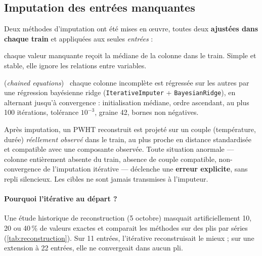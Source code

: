 \subsection{Imputation des entrées manquantes}
\label{subsec:imputation}

Deux méthodes d'imputation ont été mises en œuvre, toutes deux \textbf{ajustées
dans chaque train} et appliquées aux seules \emph{entrées} :
\begin{description}[leftmargin=1em,style=nextline]
  \item[Médiane] chaque valeur manquante reçoit la médiane de la colonne dans le
  train. Simple et stable, elle ignore les relations entre variables.
  \item[Itérative] (\emph{chained equations})~\cite{vanbuuren_2011} chaque
  colonne incomplète est régressée sur les autres par une régression bayésienne
  ridge (\texttt{IterativeImputer} + \texttt{BayesianRidge}), en alternant
  jusqu'à convergence : initialisation médiane, ordre ascendant, au plus 100
  itérations, tolérance $10^{-3}$, graine 42, bornes non négatives.
\end{description}
Après imputation, un PWHT reconstruit est projeté sur un couple
(température, durée) \emph{réellement observé} dans le train, au plus proche en
distance standardisée et compatible avec une composante observée. Toute situation
anormale --- colonne entièrement absente du train, absence de couple compatible,
non-convergence de l'imputation itérative --- déclenche une \textbf{erreur
explicite}, sans repli silencieux. Les cibles ne sont jamais transmises à
l'imputeur.

\paragraph{Pourquoi l'itérative au départ ?} Une étude historique de
reconstruction (5 octobre) masquait artificiellement 10, 20 ou 40\,\% de valeurs
exactes et comparait les méthodes sur des plis par séries (\cref{tab:reconstruction}).
Sur 11 entrées, l'itérative reconstruisait le mieux ; sur une extension à
22 entrées, elle ne convergeait dans aucun pli.

